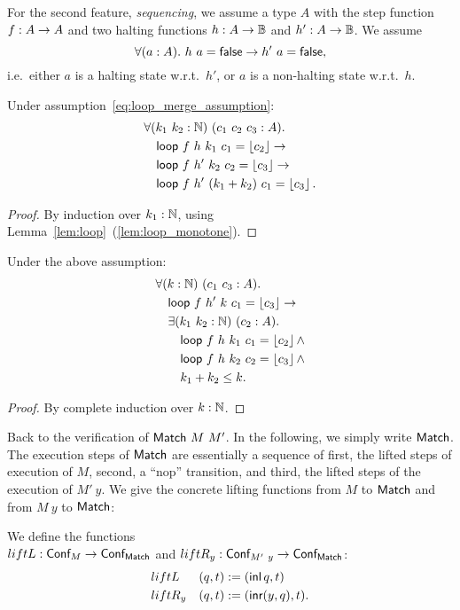 For the second feature, \emph{sequencing}, we assume a type $A$ with the step function $f : A \rightarrow A$ and two halting functions
$h : A \rightarrow \mathbb{B}$ and $h' : A \rightarrow \mathbb{B}$.  We assume
\begin{equation}
  \label{eq:loop_merge_assumption}
  \forall(a:A).~h~a = \textsf{false} \rightarrow h'~a = \textsf{false},
\end{equation}
i.e.\ either $a$ is a halting state w.r.t.\ $h'$, or $a$ is a non-halting state w.r.t.\ $h$.
\begin{lemma}
  \label{lem:loop_merge}
  Under assumption~\ref{eq:loop_merge_assumption}:
  \begin{align*}
    & \forall (k_1~k_2:\mathbb{N})~(c_1~c_2~c_3 : A).\\
    & \quad \textsf{loop}~f~h ~k_1      ~c_1 = \left\lfloor {c_2} \right\rfloor \rightarrow\\
    & \quad \textsf{loop}~f~h'~k_2      ~c_2 = \left\lfloor {c_3} \right\rfloor \rightarrow\\
    & \quad \textsf{loop}~f~h'~(k_1+k_2)~c_1 = \left\lfloor {c_3} \right\rfloor.
  \end{align*}
\end{lemma}
\begin{proof}
  By induction over $k_1:\mathbb{N}$, using Lemma~\ref{lem:loop}~(\ref{lem:loop_monotone}).
\end{proof}
\begin{lemma}
  \label{lem:loop_split}
  Under the above assumption:
  \begin{align*}
    & \forall (k:\mathbb{N})~(c_1~c_3 : A).\\
    & \quad \textsf{loop}~f~h'~k~c_1 = \left\lfloor {c_3} \right\rfloor \rightarrow \\
    & \quad \exists (k_1~k_2:\mathbb{N})~(c_2:A).\\
    & \quad \quad \textsf{loop}~f~h~k_1~c_1 = \left\lfloor {c_2} \right\rfloor \land\\
    & \quad \quad \textsf{loop}~f~h~k_2~c_2 = \left\lfloor {c_3} \right\rfloor \land\\
    & \quad \quad k_1 + k_2 \leq k.
  \end{align*}
\end{lemma}
\begin{proof}
  By complete induction over $k:\mathbb{N}$.
\end{proof}


Back to the verification of $\textsf{Match}~M~M'$.  In the following, we simply write $\textsf{Match}$.  The execution steps of $\textsf{Match}$ are essentially a sequence of
first, the lifted steps of execution of $M$, second, a ``nop'' transition, and third, the lifted steps of the execution of $M'~y$.  We give the
concrete lifting functions from $M$ to $\textsf{Match}$ and from $M~y$ to $\textsf{Match}$:
\begin{definition}
  We define the functions \\$liftL : \textsf{Conf}_M \rightarrow \textsf{Conf}_{\textsf{Match}}$ and $liftR_y : \textsf{Conf}_{M'~y} \rightarrow \textsf{Conf}_{\textsf{Match}}$:
  \begin{alignat*}{2}
    & liftL   & (q, t) &:= (\operatorname{\textsf{inl}} q,      t) \\
    & liftR_y & (q, t) &:= (\operatorname{\textsf{inr}} (y, q), t).
  \end{alignat*}
\end{definition}

